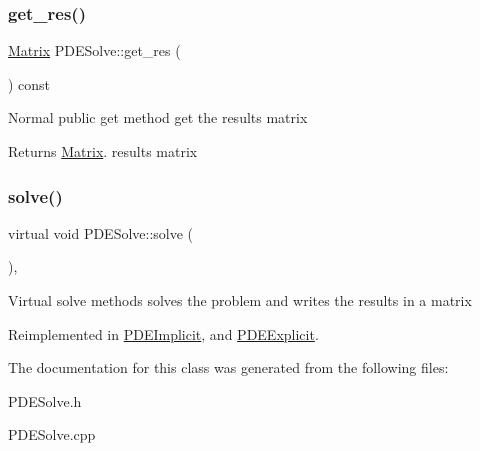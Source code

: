\subsubsection{\texorpdfstring{get\+\_\+res()}{get\_res()}}
{\footnotesize\ttfamily \hyperlink{class_matrix}{Matrix} P\+D\+E\+Solve\+::get\+\_\+res (\begin{DoxyParamCaption}{ }\end{DoxyParamCaption}) const}

Normal public get method get the results matrix \begin{DoxyReturn}{Returns}
\hyperlink{class_matrix}{Matrix}. results matrix 
\end{DoxyReturn}
\mbox{\label{class_p_d_e_solve_a2fb309c3e7f35de2f639596f7fcb17cc}} 
\subsubsection{\texorpdfstring{solve()}{solve()}}
{\footnotesize\ttfamily virtual void P\+D\+E\+Solve\+::solve (\begin{DoxyParamCaption}{ }\end{DoxyParamCaption})\hspace{0.3cm}{\ttfamily [inline]}, {\ttfamily [virtual]}}

Virtual solve methods solves the problem and writes the results in a matrix 

Reimplemented in \hyperlink{class_p_d_e_implicit_ace06b1a56c2766ca8d4bc95669d21d12}{P\+D\+E\+Implicit}, and \hyperlink{class_p_d_e_explicit_a78282717c8230e9be65599865865e0c7}{P\+D\+E\+Explicit}.



The documentation for this class was generated from the following files\+:\begin{DoxyCompactItemize}
\item 
P\+D\+E\+Solve.\+h\item 
P\+D\+E\+Solve.\+cpp\end{DoxyCompactItemize}
